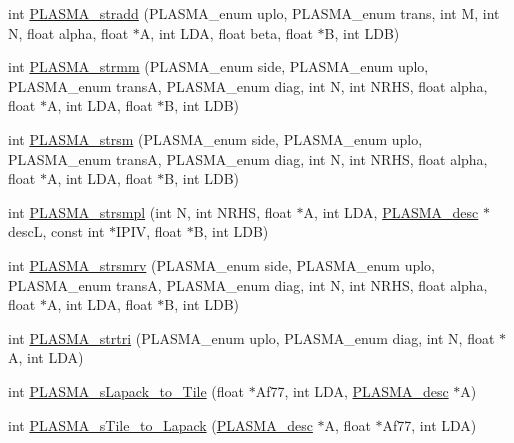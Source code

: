\begin{DoxyCompactItemize}
\item 
int \hyperlink{group__float_ga5395fb5a2b6c3f123e3fc7e5fba0dc56_ga5395fb5a2b6c3f123e3fc7e5fba0dc56}{P\+L\+A\+S\+M\+A\+\_\+stradd} (P\+L\+A\+S\+M\+A\+\_\+enum uplo, P\+L\+A\+S\+M\+A\+\_\+enum trans, int M, int N, float alpha, float $\ast$A, int L\+D\+A, float beta, float $\ast$B, int L\+D\+B)
\item 
int \hyperlink{group__float_gabbc2cf7c018815bd2c1ce8a6623b2813_gabbc2cf7c018815bd2c1ce8a6623b2813}{P\+L\+A\+S\+M\+A\+\_\+strmm} (P\+L\+A\+S\+M\+A\+\_\+enum side, P\+L\+A\+S\+M\+A\+\_\+enum uplo, P\+L\+A\+S\+M\+A\+\_\+enum trans\+A, P\+L\+A\+S\+M\+A\+\_\+enum diag, int N, int N\+R\+H\+S, float alpha, float $\ast$A, int L\+D\+A, float $\ast$B, int L\+D\+B)
\item 
int \hyperlink{group__float_ga572e80d04d4e9701bf3dd73d1f96d54c_ga572e80d04d4e9701bf3dd73d1f96d54c}{P\+L\+A\+S\+M\+A\+\_\+strsm} (P\+L\+A\+S\+M\+A\+\_\+enum side, P\+L\+A\+S\+M\+A\+\_\+enum uplo, P\+L\+A\+S\+M\+A\+\_\+enum trans\+A, P\+L\+A\+S\+M\+A\+\_\+enum diag, int N, int N\+R\+H\+S, float alpha, float $\ast$A, int L\+D\+A, float $\ast$B, int L\+D\+B)
\item 
int \hyperlink{group__float_ga245da4f8540c426fde27a50eff39b64a_ga245da4f8540c426fde27a50eff39b64a}{P\+L\+A\+S\+M\+A\+\_\+strsmpl} (int N, int N\+R\+H\+S, float $\ast$A, int L\+D\+A, \hyperlink{structplasma__desc__t}{P\+L\+A\+S\+M\+A\+\_\+desc} $\ast$desc\+L, const int $\ast$I\+P\+I\+V, float $\ast$B, int L\+D\+B)
\item 
int \hyperlink{group__float_ga7713151eac0c0ff54c5a6aac1957b5e0_ga7713151eac0c0ff54c5a6aac1957b5e0}{P\+L\+A\+S\+M\+A\+\_\+strsmrv} (P\+L\+A\+S\+M\+A\+\_\+enum side, P\+L\+A\+S\+M\+A\+\_\+enum uplo, P\+L\+A\+S\+M\+A\+\_\+enum trans\+A, P\+L\+A\+S\+M\+A\+\_\+enum diag, int N, int N\+R\+H\+S, float alpha, float $\ast$A, int L\+D\+A, float $\ast$B, int L\+D\+B)
\item 
int \hyperlink{group__float_gaaf0df7b8ff03a270a25da71b9f133abb_gaaf0df7b8ff03a270a25da71b9f133abb}{P\+L\+A\+S\+M\+A\+\_\+strtri} (P\+L\+A\+S\+M\+A\+\_\+enum uplo, P\+L\+A\+S\+M\+A\+\_\+enum diag, int N, float $\ast$A, int L\+D\+A)
\item 
int \hyperlink{group__float_gaad3dd3212d3d774f44094c3f0835ef22_gaad3dd3212d3d774f44094c3f0835ef22}{P\+L\+A\+S\+M\+A\+\_\+s\+Lapack\+\_\+to\+\_\+\+Tile} (float $\ast$Af77, int L\+D\+A, \hyperlink{structplasma__desc__t}{P\+L\+A\+S\+M\+A\+\_\+desc} $\ast$A)
\item 
int \hyperlink{group__float_gacfc6859eb0da6e5c246a70178b5567be_gacfc6859eb0da6e5c246a70178b5567be}{P\+L\+A\+S\+M\+A\+\_\+s\+Tile\+\_\+to\+\_\+\+Lapack} (\hyperlink{structplasma__desc__t}{P\+L\+A\+S\+M\+A\+\_\+desc} $\ast$A, float $\ast$Af77, int L\+D\+A)
\end{DoxyCompactItemize}


